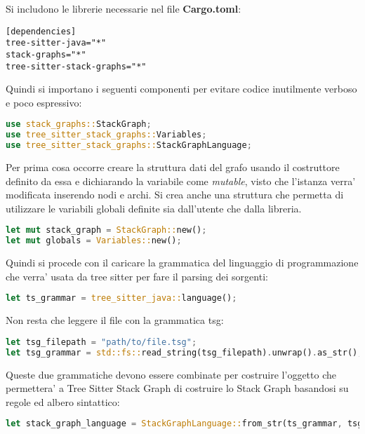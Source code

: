 Si includono le librerie necessarie nel file \textbf{Cargo.toml}:

\begin{lstlisting}
[dependencies]
tree-sitter-java="*"
stack-graphs="*"
tree-sitter-stack-graphs="*"
\end{lstlisting}

Quindi si importano i seguenti componenti per evitare codice inutilmente verboso e poco espressivo:
\begin{lstlisting}[language=Rust]
use stack_graphs::StackGraph;
use tree_sitter_stack_graphs::Variables; 
use tree_sitter_stack_graphs::StackGraphLanguage; 
\end{lstlisting}

Per prima cosa occorre creare la struttura dati del grafo usando il costruttore definito da essa e dichiarando la variabile come \emph{mutable}, visto che l'istanza verra' modificata inserendo nodi e archi.
Si crea anche una struttura che permetta di utilizzare le variabili globali definite sia dall'utente che dalla libreria.

\begin{lstlisting}[language=Rust]
let mut stack_graph = StackGraph::new();
let mut globals = Variables::new();
\end{lstlisting}

Quindi si procede con il caricare la grammatica del linguaggio di programmazione che verra' usata da tree sitter per fare il parsing dei sorgenti:

\begin{lstlisting}[language=Rust]
let ts_grammar = tree_sitter_java::language();
\end{lstlisting}

Non resta che leggere il file con la grammatica tsg:

\begin{lstlisting}[language=Rust]
let tsg_filepath = "path/to/file.tsg";
let tsg_grammar = std::fs::read_string(tsg_filepath).unwrap().as_str();
\end{lstlisting}

Queste due grammatiche devono essere combinate per costruire l'oggetto che permettera' a Tree Sitter Stack Graph di costruire lo Stack Graph basandosi su regole ed albero sintattico:

\begin{lstlisting}[language=Rust]
let stack_graph_language = StackGraphLanguage::from_str(ts_grammar, tsg_grammar).unwrap();
\end{lstlisting}

